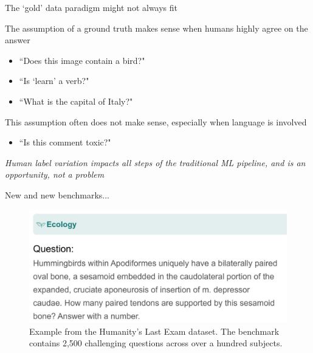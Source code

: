 \documentclass[12pt,aspectratio=169,handout]{beamer}
\begin{document}
\begin{frame}{The `gold' data paradigm might not always fit}

The assumption of a ground truth makes sense when humans highly agree on the answer

\begin{itemize}
	\item ``Does this image contain a bird?"
	\item ``Is `learn' a verb?"
	\item ``What is the capital of Italy?"
\end{itemize}

This assumption often does not make sense, especially when language is involved

\begin{itemize}
	\item ``Is this comment toxic?"
\end{itemize}

\emph{Human label variation impacts all steps of the traditional ML pipeline, and is an opportunity, not a problem}


\end{frame}




\begin{frame}{New and new benchmarks...}



\begin{figure}
\includegraphics[width=0.8\linewidth]{img/humanity2.jpg}
\caption{Example from the Humanity's Last Exam dataset. The benchmark contains 2,500 challenging questions across over a hundred subjects.}
\end{figure}


\end{frame}
\end{document}

